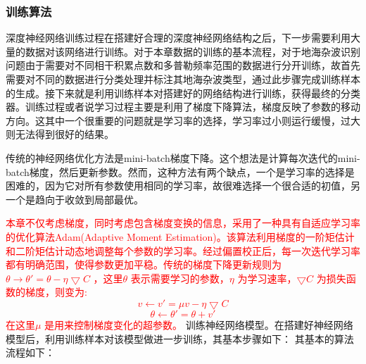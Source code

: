 \subsubsection{训练算法}

深度神经网络训练过程在搭建好合理的深度神经网络结构之后，下一步需要利用大量的数据对该网络进行训练。对于本章数据的训练的基本流程，对于地海杂波识别问题由于需要对不同相干积累点数和多普勒频率范围的数据进行分开训练，故首先需要对不同的数据进行分类处理并标注其地海杂波类型，通过此步骤完成训练样本的生成。接下来就是利用训练样本对搭建好的网络结构进行训练，获得最终的分类器。训练过程或者说学习过程主要是利用了梯度下降算法，梯度反映了参数的移动方向。这其中一个很重要的问题就是学习率的选择，学习率过小则运行缓慢，过大则无法得到很好的结果。

传统的神经网络优化方法是mini-batch梯度下降。这个想法是计算每次迭代的mini-batch梯度，然后更新参数。然而，这种方法有两个缺点，一个是学习率的选择是困难的，因为它对所有参数使用相同的学习率，故很难选择一个很合适的初值，另一个是趋向于收敛到局部最优。

\textcolor{red}{本章不仅考虑梯度，同时考虑包含梯度变换的信息，采用了一种具有自适应学习率的优化算法Adam(Adaptive Moment Estimation)。该算法利用梯度的一阶矩估计和二阶矩估计动态地调整每个参数的学习率。经过偏置校正后，每一次迭代学习率都有明确范围，使得参数更加平稳。传统的梯度下降更新规则为$\theta \rightarrow \theta'=\theta-\eta\bigtriangledown C$ ，这里$\theta$ 表示需要学习的参数，$\eta$ 为学习速率，$\bigtriangledown C$ 为损失函数的梯度，则变为:
\begin{equation}
	v\leftarrow v'=\mu v - \eta \bigtriangledown C
\end{equation}
\begin{equation}
	\theta \leftarrow \theta' = \theta +v'
\end{equation}
在这里$\mu$ 是用来控制梯度变化的超参数。
}
训练神经网络模型。在搭建好神经网络模型后，利用训练样本对该模型做进一步训练，其基本步骤如下：
其基本的算法流程如下：

